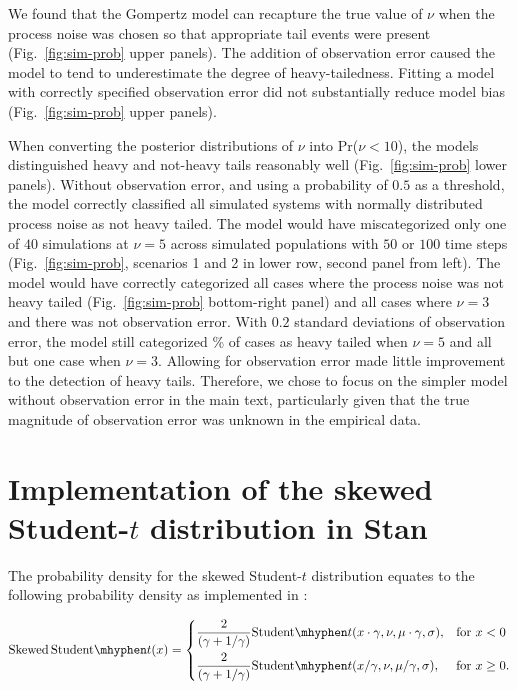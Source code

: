 \documentclass[12pt]{article}
\begin{document}
We found that the Gompertz model can recapture
the true value of \(\nu\) when the process noise was chosen so that appropriate
tail events were present (Fig.~\ref{fig:sim-prob} upper panels). The addition
of observation error caused the model to tend to underestimate the degree of
heavy-tailedness. Fitting a model with correctly specified observation error
did not substantially reduce model bias (Fig.~\ref{fig:sim-prob} upper panels).

When converting the posterior distributions of $\nu$ into Pr($\nu < 10$), the
models distinguished heavy and not-heavy tails reasonably well (Fig.~\ref{fig:sim-prob} lower panels).
Without observation error, and using a
probability of $0.5$ as a threshold, the model correctly classified all
simulated systems with normally distributed process noise as not heavy tailed.
The model would have miscategorized only one of $40$ simulations at $\nu = 5$
across simulated populations with $50$ or $100$ time steps 
(Fig.~\ref{fig:sim-prob}, scenarios 1 and 2 in lower row, second panel from left).
The model would have correctly categorized all cases where the process noise
was not heavy tailed (Fig.~\ref{fig:sim-prob} bottom-right panel) and all cases
where $\nu = 3$ and there was not observation error. With $0.2$ standard
deviations of observation error, the model still categorized
\obsErrorNuFivePerc\% of cases as heavy tailed when $\nu = 5$ and all but one
case when $\nu = 3$. Allowing for observation error made little improvement to
the detection of heavy tails. Therefore, we chose to focus on the simpler model
without observation error in the main text, particularly given that the true
magnitude of observation error was unknown in the empirical data.

\section{Implementation of the skewed Student-$t$ distribution in Stan}

The probability density for the skewed Student-$t$ distribution
\citep{fernandez1998} equates to the following probability density as
implemented in \citet{king2012}:

\begin{equation}
  \mathrm{Skewed\,Student}\mhyphen t(x) =
\begin{dcases}
\frac{2}{(\gamma + 1/\gamma)}
         \mathrm{Student}\mhyphen t(x \cdot \gamma, \nu, \mu \cdot \gamma, \sigma),& \text{for } x < 0\\
       \frac{2}{(\gamma + 1/\gamma)}
         \mathrm{Student}\mhyphen t(x / \gamma, \nu, \mu / \gamma, \sigma),& \text{for } x \ge 0.
\end{dcases}
\end{equation}
\end{document}
